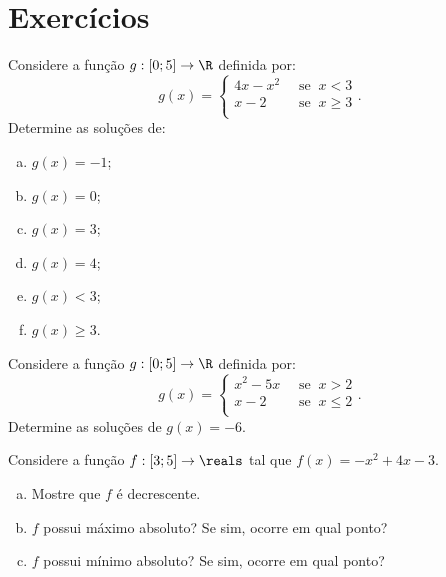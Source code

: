 \section{Exercícios}

\begin{exercise}
  Considere a função $g: [0 ; 5] \to \R$ definida por: $$g(x) =
                                \begin{cases}
                                4x-x^2 & \ \text{ se } \ x< 3 \\
                                x-2 & \ \text{ se } \  x \geq 3 \\
                                \end{cases}.$$
Determine as soluções de:
\begin{enumerate}[a)]
  \item $g(x) = -1$;
  \item $g(x) = 0$;
  \item $g(x) = 3$;
  \item $g(x) = 4$;
  \item $g(x) < 3$;
  \item $g(x) \geq 3$.
\end{enumerate}
\end{exercise}

\begin{exercise}
  Considere a função $g: [0 ; 5] \to \R$ definida por: $$g(x) =
                                \begin{cases}
                                x^2-5x & \ \text{ se } \ x> 2 \\
                                x-2 & \ \text{ se } \  x \leq 2 \\
                                \end{cases}.$$
Determine as soluções de $g(x) = -6$.
\end{exercise}

\begin{exercise}
  Considere a função $f:[3;5]\to\reals$ tal que $f(x)=-x^2+4x-3$.
  \begin{enumerate}[a)]
    \item Mostre que $f$ é decrescente.
    \item $f$ possui máximo absoluto? Se sim, ocorre em qual ponto?
    \item $f$ possui mínimo absoluto? Se sim, ocorre em qual ponto?
  \end{enumerate}
\end{exercise}

